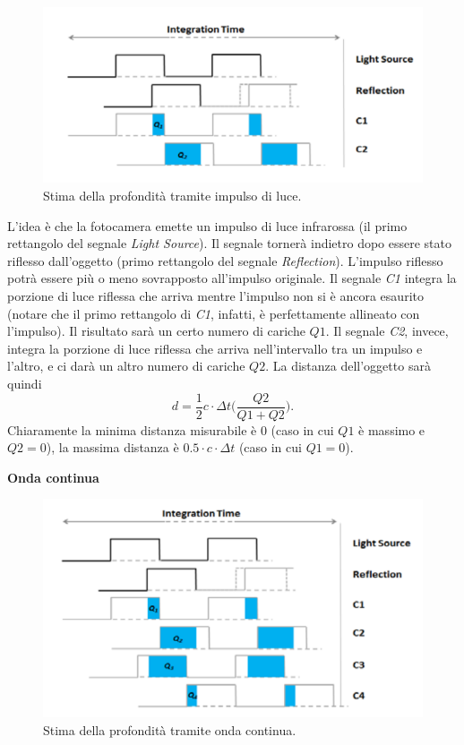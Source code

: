 \documentclass[a4paper,11pt]{article}
\begin{document}
\renewcommand{\thefigure}{3.30}
\begin{figure}[!h]
  \centering
    \includegraphics[scale=0.4]{images/3/impulse_tof.png}
    \caption{Stima della profondità tramite impulso di luce.}
\end{figure}

\par
L'idea è che la fotocamera emette un impulso di luce infrarossa (il primo rettangolo del segnale \textit{Light Source}). Il segnale tornerà indietro dopo essere stato riflesso dall'oggetto
(primo rettangolo del segnale \textit{Reflection}). L'impulso riflesso potrà essere più o meno sovrapposto all'impulso originale. Il segnale \textit{C1} integra la porzione di luce riflessa
che arriva mentre l'impulso non si è ancora esaurito (notare che il primo rettangolo di \textit{C1}, infatti, è perfettamente allineato con l'impulso). Il risultato sarà un certo numero
di cariche $Q1$. Il segnale \textit{C2}, invece, integra la porzione di luce riflessa che arriva nell'intervallo tra un impulso e l'altro, e ci darà un altro numero di cariche $Q2$.
La distanza dell'oggetto sarà quindi
\[
d = \frac{1}{2} c \cdot \Delta t \Bigg(\frac{Q2}{Q1 + Q2}\Bigg).
\]
Chiaramente la minima distanza misurabile è 0 (caso in cui $Q1$ è massimo e $Q2 = 0$), la massima distanza è $0.5 \cdot c \cdot \Delta t$ (caso in cui $Q1 = 0$).

\par
\textbf{Onda continua}

\renewcommand{\thefigure}{3.31}
\begin{figure}[!h]
  \centering
    \includegraphics[scale=0.4]{images/3/cw_tof.png}
    \caption{Stima della profondità tramite onda continua.}
\end{figure}
\end{document}
